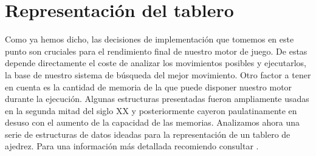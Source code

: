 \documentclass[letterpaper,12pt]{article}
\begin{document}
\section{Representación del tablero}

Como ya hemos dicho, las decisiones de implementación que tomemos en este punto son 
cruciales para el rendimiento final de nuestro motor de juego. De estas depende
directamente el coste de analizar los movimientos posibles y ejecutarlos, la base de
nuestro sistema de búsqueda del mejor movimiento. Otro factor a tener en cuenta es la
cantidad de memoria de la que puede disponer nuestro motor durante la ejecución. Algunas 
estructuras presentadas fueron ampliamente usadas en la segunda mitad del siglo XX y
posteriormente cayeron paulatinamente en desuso con el aumento de la capacidad de las 
memorias. Analizamos ahora una serie de estructuras de datos ideadas para la 
representación de un tablero de ajedrez. Para una información más detallada recomiendo
consultar \cite{BoardRepresentation1, BoardRepresentation2, BoardRepresentation3}.
\end{document}
